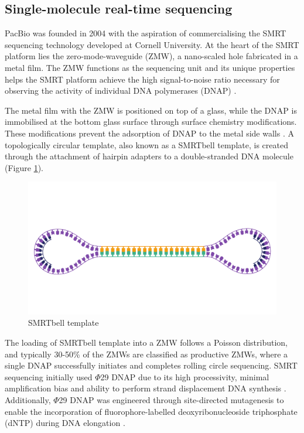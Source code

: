 \subsection{Single-molecule real-time sequencing}

PacBio was founded in 2004 with the aspiration of commercialising the SMRT sequencing technology developed at Cornell University. At the heart of the SMRT platform lies the zero-mode-waveguide (ZMW), a nano-scaled hole fabricated in a metal film. The ZMW functions as the sequencing unit and its unique properties helps the SMRT platform achieve the high signal-to-noise ratio necessary for observing the activity of individual DNA polymerases (DNAP) \cite{Levene2003-og}. 

The metal film with the ZMW is positioned on top of a glass, while the DNAP is immobilised at the bottom glass surface through surface chemistry modifications. These modifications prevent the adsorption of DNAP to the metal side walls \cite{Korlach2008-aq, Eid2009-ol}. A topologically circular template, also known as a SMRTbell template, is created through the attachment of hairpin adapters to a double-stranded DNA molecule (Figure \ref{figure:smrtbell-template}).

\begin{figure}[htbp!]
\caption{SMRTbell template}
\label{figure:smrtbell-template}
\begin{centering}
\includegraphics[width=\textwidth]{Vector/SMRTbell_template.pdf}
\end{centering}
\end{figure}

The loading of SMRTbell template into a ZMW follows a Poisson distribution, and typically 30-50\% of the ZMWs are classified as productive ZMWs, where a single DNAP successfully initiates and completes rolling circle sequencing. SMRT sequencing initially used $\Phi$29 DNAP due to its high processivity, minimal amplification bias and ability to perform strand displacement DNA synthesis \cite{Eid2009-ol}. Additionally, $\Phi$29 DNAP was engineered through site-directed mutagenesis to enable the incorporation of fluorophore-labelled deoxyribonucleoside triphosphate (dNTP) during DNA elongation \cite{Eid2009-ol, Korlach2008-fv}. 

